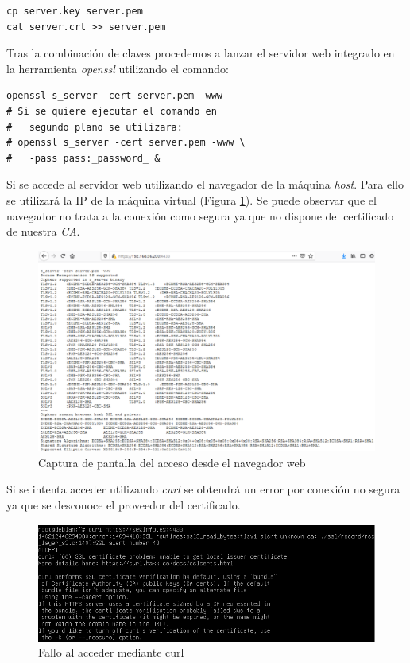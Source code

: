 \documentclass[10pt,a4paper]{article}
\begin{document}
\begin{lstlisting}
cp server.key server.pem
cat server.crt >> server.pem
\end{lstlisting}

Tras la combinación de claves procedemos a lanzar el servidor web integrado en la herramienta \emph{openssl} utilizando el comando:

\begin{lstlisting}
openssl s_server -cert server.pem -www
# Si se quiere ejecutar el comando en 
#	segundo plano se utilizara:
# openssl s_server -cert server.pem -www \ 
#	-pass pass:_password_ &
\end{lstlisting}

Si se accede al servidor web utilizando el navegador de la máquina \emph{host}. Para ello se utilizará la IP de la máquina virtual (Figura \ref{fig:tarea3_paso2}). Se puede observar que el navegador no trata a la conexión como segura ya que no dispone del certificado de nuestra \emph{CA}.\\


\begin{figure}[h!]
\centering
\includegraphics[scale=0.4]{images/tarea3_paso2.png}
\caption{Captura de pantalla del acceso desde el navegador web}
\label{fig:tarea3_paso2}
\end{figure}
\newpage

Si se intenta acceder utilizando \emph{curl} se obtendrá un error por conexión no segura ya que se desconoce el proveedor del certificado.\\
 
\begin{figure}[h!]
	\centering
	\includegraphics[scale=0.4]{images/tarea3_fallo_curl.png}
	\caption{Fallo al acceder mediante curl}
	\label{fig:tarea3_fallo_curl}
\end{figure}
\end{document}
